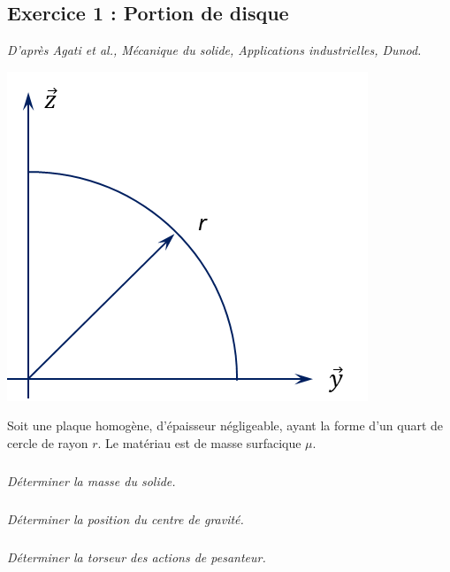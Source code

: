 \documentclass[10pt,fleqn]{article} %
\begin{document}

\vspace{7cm}
\pagestyle{fancy}
\thispagestyle{plain}


\def\columnseprulecolor{\color{ocre}}
\setlength{\columnseprule}{0.4pt} 

\begin{multicols}{2}
\subsection*{Exercice 1 : Portion de disque}
\begin{flushright}
\textit{D'après Agati et al., Mécanique du solide, Applications industrielles, Dunod.}
\end{flushright}

\begin{center}
\includegraphics[width=.7\linewidth]{images/disque}
\end{center}
Soit une plaque homogène, d'épaisseur négligeable, ayant la forme d'un quart de cercle de rayon $r$. Le matériau est de masse surfacique $\mu$.

\subparagraph{}
\textit{Déterminer la masse du solide.}

\subparagraph{}
\textit{Déterminer la position du centre de gravité.}

\subparagraph{}
\textit{Déterminer la torseur des actions de pesanteur.}






\end{multicols}
\end{document}
